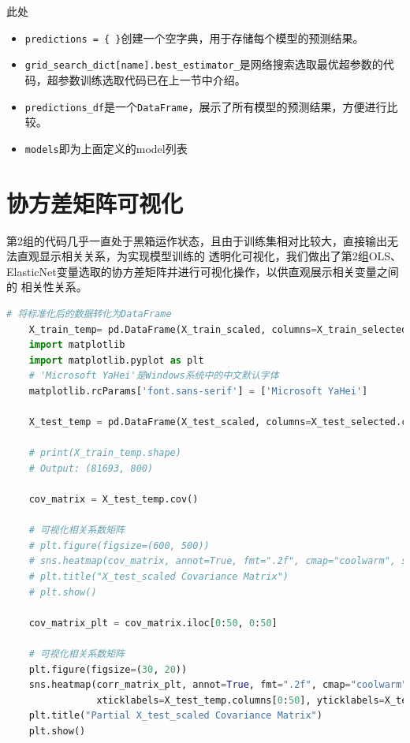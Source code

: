 \documentclass[
    report,     %
    oneside,    %
    UTF8,       %
    zihao=-4    %
]{config} %
\begin{document}
此处
\begin{itemize}
    \item \lstinline|predictions = { }|创建一个空字典，用于存储每个模型的预测结果。
    \item \lstinline|grid_search_dict[name].best_estimator_|是网络搜索选取最优超参数的代码，超参数训练选取代码已在上一节中介绍。
    \item \lstinline|predictions_df|是一个\lstinline|DataFrame|，展示了所有模型的预测结果，方便进行比较。
    \item \lstinline|models|即为上面定义的model列表
\end{itemize}

\section{协方差矩阵可视化}

第2组的代码几乎一直处于黑箱运作状态，且由于训练集相对比较大，直接输出无法直观显示相关关系，为实现模型训练的
透明化可视化，我们做出了第2组OLS、ElasticNet变量选取的协方差矩阵并进行可视化操作，以供直观展示相关变量之间的
相关性关系。

\begin{lstlisting}[label=code:ols_enet_cov_matrix, language=Python, caption=OLS、ElasticNet变量协方差矩阵可视化代码]
    # 将标准化后的数据转化为DataFrame
    X_train_temp= pd.DataFrame(X_train_scaled, columns=X_train_selected.columns)
    import matplotlib
    import matplotlib.pyplot as plt
    # 'Microsoft YaHei'是Windows系统中的中文默认字体
    matplotlib.rcParams['font.sans-serif'] = ['Microsoft YaHei'] 
    
    X_test_temp = pd.DataFrame(X_test_scaled, columns=X_test_selected.columns)
    
    # print(X_train_temp.shape)
    # Output: (81693, 800)
    
    cov_matrix = X_test_temp.cov()
    
    # 可视化相关系数矩阵
    # plt.figure(figsize=(600, 500))
    # sns.heatmap(cov_matrix, annot=True, fmt=".2f", cmap="coolwarm", square=True, xticklabels=X.columns, yticklabels=X.columns, vmin=-0.75, vmax=0.75)
    # plt.title("X_test_scaled Covariance Matrix")
    # plt.show()
    
    cov_matrix_plt = cov_matrix.iloc[0:50, 0:50]
    
    # 可视化相关系数矩阵
    plt.figure(figsize=(30, 20))
    sns.heatmap(corr_matrix_plt, annot=True, fmt=".2f", cmap="coolwarm", square=True, 
                xticklabels=X_test_temp.columns[0:50], yticklabels=X_test_temp.columns[0:50], vmin=-0.75, vmax=0.75)
    plt.title("Partial X_test_scaled Covariance Matrix")
    plt.show()
\end{lstlisting}
\end{document}
